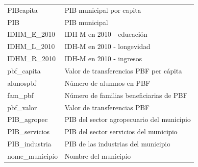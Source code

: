 \documentclass[
]{article}
\begin{document}
\begin{table}[!h]
\begin{tabular}[t]{ll}
\addlinespace
PIBcapita & PIB municipal por capita\\
PIB & PIB municipal\\
IDHM\_E\_2010 & IDH-M en 2010 - educación\\
IDHM\_L\_2010 & IDH-M en 2010 - longevidad\\
IDHM\_R\_2010 & IDH-M en 2010 - ingresos\\
\addlinespace
pbf\_capita & Valor de transferencias PBF per cápita\\
alunospbf & Número de alumnos en PBF\\
fam\_pbf & Número de familias beneficiarias de PBF\\
pbf\_valor & Valor de transferencias PBF\\
PIB\_agropec & PIB del sector agropecuario del municipio\\
\addlinespace
PIB\_servicios & PIB del sector servicios del municipio\\
PIB\_industria & PIB de las industrias del municipio\\
nome\_municipio & Nombre del municipio\\
\bottomrule
\end{tabular}
\end{table}
\end{document}
